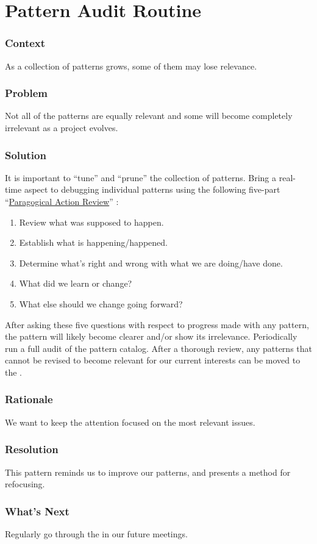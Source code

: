 \section{Pattern Audit Routine}\label{sec:Pattern_Audit_Routine}

\subsubsection*{Context} As a collection of patterns grows, some of them may lose relevance.

\subsubsection*{Problem} Not all of the patterns are equally relevant and some will become completely irrelevant as a project evolves.

\subsubsection*{Solution} It is important to ``tune'' and ``prune'' the collection of patterns.  Bring a real-time aspect to debugging individual patterns using the following five-part ``\href{http://metameso.org/~joe/docs/The-Paragogical-Action-Review.pdf}{Paragogical Action Review}'' \cite[Chapter 28]{peeragogy-handbook}:

\begin{enumerate}
\item Review what was supposed to happen.
\item Establish what is happening/happened.
\item Determine what’s right and wrong with what we are doing/have done.
\item What did we learn or change?
\item What else should we change going forward?
\end{enumerate}

After asking these five questions with respect to progress made with any pattern, the pattern will likely become clearer and/or show its irrelevance.  Periodically run a full audit of the pattern catalog.   After a thorough review, any patterns that cannot be revised to become relevant for our current interests can be moved to the .

\subsubsection*{Rationale} We want to keep the attention focused on the most relevant issues.

\subsubsection*{Resolution} This pattern reminds us to improve our patterns, and presents a method for refocusing.

\subsubsection*{What's Next} Regularly go through the  in our future meetings.